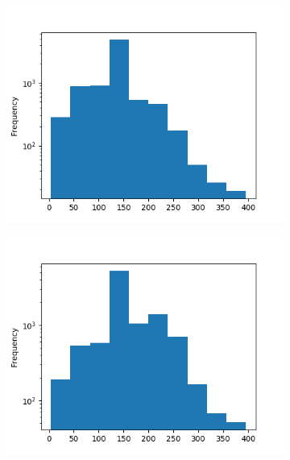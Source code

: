 \begin{figure}[!ht]
    \caption{Monthly work histograms.}
    \label{fig:monthly-work-hist}

    \begin{subfigure}[ht]{.5\linewidth}
        \centering
        \includegraphics[width=\textwidth]{./img/monthly-work-original.png}
    \end{subfigure}
    \begin{subfigure}[ht]{.5\linewidth}
        \centering
        \includegraphics[width=\textwidth]{./img/monthly-work-new.png}
    \end{subfigure}


\end{figure}
